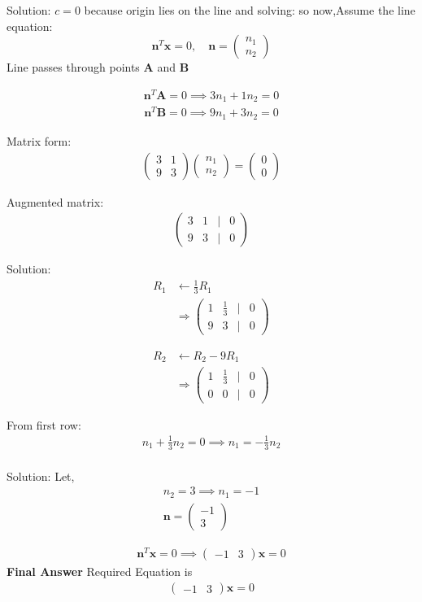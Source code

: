 \documentclass{beamer}
\numberwithin{equation}{section}
\newcommand{\myvec}[1]{\ensuremath{\begin{pmatrix}#1\end{pmatrix}}}
\let\vec\mathbf
\begin{document}
\begin{frame}{Solution:}
$c=0$ because origin lies on the line and solving:
so now,Assume the line equation:
\[
\vec{n}^T \vec{x} = 0, \quad 
\vec{n} = \myvec{n_1\\n_2}
\]
Line passes through points $\vec{A}$ and $\vec{B}$

\begin{align}
\vec{n}^T \vec{A} = 0 \implies 3 n_1 + 1 n_2 = 0
\end{align}
\begin{align}
    \vec{n}^T \vec{B} = 0 \implies 9 n_1 + 3 n_2 = 0
\end{align}


Matrix form:
\begin{align}
    \myvec{3 & 1 \\ 9 & 3} \myvec{n_1\\n_2} = \myvec{0\\0}
\end{align}

Augmented matrix:
\begin{align}
\myvec{3 & 1 &\big|& 0 \\ 9 & 3 & \big| & 0}
\end{align}
\end{frame}
\begin{frame}{Solution:}
\begin{align}R_{1} &\leftarrow \frac{1}{3}R_{1} \nonumber\\&
\Rightarrow \myvec{1 & \frac{1}{3} & \big| & 0 \\ 9 & 3 & \big| & 0}
\end{align}

\begin{align}R_{2} &\leftarrow R_{2}-9R_{1} \nonumber\\&
\Rightarrow \myvec{1 & \frac{1}{3} & \big| & 0 \\ 0 & 0 & \big| & 0}
\end{align}

From first row:
\begin{align}
n_1 + \frac{1}{3} n_2 = 0 \implies n_1 = -\frac{1}{3} n_2\\
\end{align}
\end{frame}
\begin{frame}{Solution:}
Let,
\begin{align}
n_2 = 3 \implies n_1 = -1\\
\vec{n} = \myvec{-1\\3}
\end{align}

\begin{align}
    \vec{n}^T \vec{x} = 0 \implies \myvec{-1 & 3} \vec{x} = 0 
\end{align}
\textbf{Final Answer}
Required Equation is \begin{align*}
\boxed{\myvec{-1 & 3} \vec{x} = 0}
\end{align*}
\end{frame}
\end{document}

